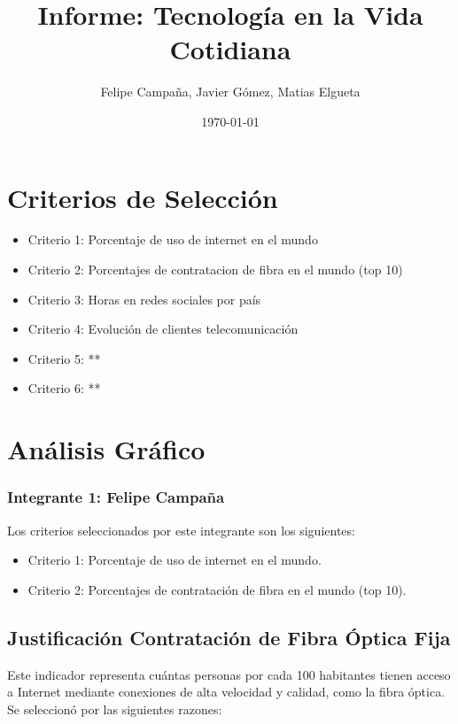 \documentclass[12pt, a4paper]{article}
\title{Informe: Tecnología en la Vida Cotidiana}
\author{Felipe Campaña, Javier Gómez, Matias Elgueta}
\date{\today\\[2cm]
}
\begin{document}
\maketitle

\section*{Criterios de Selección}
\begin{itemize}
    \item Criterio 1: Porcentaje de uso de internet en el mundo
    \item Criterio 2: Porcentajes de contratacion de fibra en el mundo (top 10)
    \item Criterio 3: Horas en redes sociales por país
    \item Criterio 4: Evolución de clientes telecomunicación
    \item Criterio 5: **
    \item Criterio 6: **
\end{itemize}

\section*{Análisis Gráfico}

\subsubsection*{Integrante 1: Felipe Campaña}
Los criterios seleccionados por este integrante son los siguientes:
\begin{itemize}
    \item Criterio 1: Porcentaje de uso de internet en el mundo.
    \item Criterio 2: Porcentajes de contratación de fibra en el mundo (top 10).
\end{itemize}

\subsection{Justificación Contratación de Fibra Óptica Fija}

Este indicador representa cuántas personas por cada 100 habitantes tienen acceso a Internet mediante conexiones de alta velocidad y calidad, como la fibra óptica. Se seleccionó por las siguientes razones:
\end{document}
